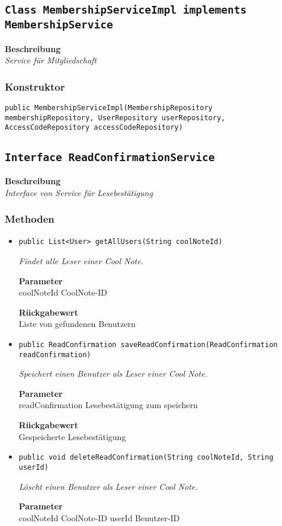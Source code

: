     \subsection{\texttt{Class MembershipServiceImpl implements MembershipService}}
    \textbf{Beschreibung} \\
    \textit{Service für Mitgliedschaft}
    \subsubsection*{Konstruktor}
    \texttt{public MembershipServiceImpl(MembershipRepository membershipRepository, UserRepository userRepository, AccessCodeRepository accessCodeRepository)}
    \subsection{\texttt{Interface ReadConfirmationService}}
    \textbf{Beschreibung} \\
    \textit{Interface von Service für Lesebestätigung}
    \subsubsection*{Methoden}
    \begin{itemize}
    	\item{\texttt{public List<User> getAllUsers(String coolNoteId)}}
    	
    	\textit{Findet alle Leser einer Cool Note.}
    	
    	\textbf{Parameter} \\
    	coolNoteId CoolNote-ID
    	
    	\textbf{Rückgabewert} \\
    	Liste von gefundenen Benutzern        \item{\texttt{public ReadConfirmation saveReadConfirmation(ReadConfirmation readConfirmation)}}
    	
    	\textit{Speichert einen Benutzer als Leser einer Cool Note.}
    	
    	\textbf{Parameter} \\
    	readConfirmation Lesebestätigung zum speichern
    	
    	\textbf{Rückgabewert} \\
    	Gespeicherte Lesebestätigung        \item{\texttt{public void deleteReadConfirmation(String coolNoteId, String userId)}}
    	
    	\textit{Löscht einen Benutzer als Leser einer Cool Note.}
    	
    	\textbf{Parameter} \\
    	coolNoteId CoolNote-ID
    	userId Benutzer-ID
    	
    	
    \end{itemize}
